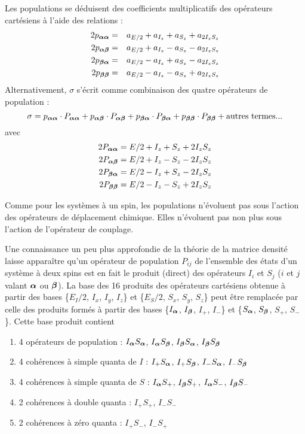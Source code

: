 Les populations se déduisent des coefficients multiplicatifs des opérateurs cartésiens 
à l'aide des relations :
\begin{eqnarray}
\label{eqn:popisa}
2 p_{\boldsymbol{\alpha}\boldsymbol{\alpha}} & = & a_{E/2} + a_{I_z} + a_{S_z} + a_{2I_zS_z} \\
2 p_{\boldsymbol{\alpha}\boldsymbol{\beta}} & = & a_{E/2} + a_{I_z} - a_{S_z} - a_{2I_zS_z} \\
2 p_{\boldsymbol{\beta}\boldsymbol{\alpha}} & = & a_{E/2} - a_{I_z} + a_{S_z} - a_{2I_zS_z} \\
\label{eqn:popisd}
2 p_{\boldsymbol{\beta}\boldsymbol{\beta}} & = & a_{E/2} - a_{I_z} - a_{S_z} + a_{2I_zS_z}
\end{eqnarray}
Alternativement, $\sigma$ s'écrit comme combinaison des quatre opérateurs de population :
\begin{equation}
\sigma = p_{\boldsymbol{\alpha}\boldsymbol{\alpha}} \cdot P_{\boldsymbol{\alpha}\boldsymbol{\alpha}} + p_{\boldsymbol{\alpha}\boldsymbol{\beta}} \cdot P_{\boldsymbol{\alpha}\boldsymbol{\beta}}
+ p_{\boldsymbol{\beta}\boldsymbol{\alpha}} \cdot P_{\boldsymbol{\beta}\boldsymbol{\alpha}} + p_{\boldsymbol{\beta}\boldsymbol{\beta}} \cdot P_{\boldsymbol{\beta}\boldsymbol{\beta}} + \mbox{autres termes...}
\end{equation}
avec
\begin{eqnarray}
2 P_{\boldsymbol{\alpha}\boldsymbol{\alpha}} = E/2 + I_z + S_z + 2I_zS_z \\
2 P_{\boldsymbol{\alpha}\boldsymbol{\beta}} = E/2 + I_z - S_z - 2I_zS_z \\
2 P_{\boldsymbol{\beta}\boldsymbol{\alpha}} = E/2 - I_z + S_z - 2I_zS_z \\
2 P_{\boldsymbol{\beta}\boldsymbol{\beta}} = E/2 - I_z - S_z + 2I_zS_z
\end{eqnarray}

Comme pour les systèmes à un spin, les populations n'évoluent pas sous l'action des 
opérateurs de déplacement chimique. 
Elles n'évoluent pas non plus sous l'action de 
l'opérateur de couplage.

Une connaissance un peu plus approfondie de la théorie de la matrice densité
laisse apparaître qu'un opérateur de population $P_{ij}$ de l'ensemble
des états d'un système à deux spins est en fait le produit (direct) des
opérateurs $I_{i}$ et $S_{j}$ ($i$ et $j$ valant $\boldsymbol{\alpha}$ ou $\boldsymbol{\beta}$).
La base des 16 produits des opérateurs cartésiens obtenue à partir des
bases \{$E_I/2$, $I_x$, $I_y$, $I_z$\} et \{$E_S/2$, $S_x$, $S_y$, $S_z$\} peut être
remplacée par celle des produits formés à partir des bases
\{$I_{\boldsymbol{\alpha}}$, $I_{\boldsymbol{\beta}}$, $I_+$, $I_-$\} et 
\{$S_{\boldsymbol{\alpha}}$, $S_{\boldsymbol{\beta}}$, $S_+$, $S_-$\}.
Cette base produit contient
\begin{enumerate}
\item 4 opérateurs de population : 
$I_{\boldsymbol{\alpha}}S_{\boldsymbol{\alpha}}$, $I_{\boldsymbol{\alpha}}S_{\boldsymbol{\beta}}$, $I_{\boldsymbol{\beta}}S_{\boldsymbol{\alpha}}$, $I_{\boldsymbol{\beta}}S_{\boldsymbol{\beta}}$
\item 4 cohérences à simple quanta de $I$ : 
$I_+S_{\boldsymbol{\alpha}}$, $I_+S_{\boldsymbol{\beta}}$, $I_-S_{\boldsymbol{\alpha}}$, $I_-S_{\boldsymbol{\beta}}$
\item 4 cohérences à simple quanta de $S$ : 
$I_{\boldsymbol{\alpha}}S_+$, $I_{\boldsymbol{\beta}}S_+$, $I_{\boldsymbol{\alpha}}S_-$, $I_{\boldsymbol{\beta}}S_-$
\item 2 cohérences à double quanta : $I_+S_+$, $I_-S_-$
\item 2 cohérences à zéro quanta : $I_+S_-$, $I_-S_+$
\end{enumerate}

